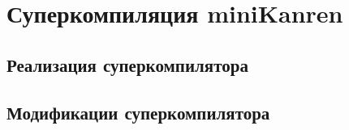 \section{Суперкомпиляция miniKanren}
% 
% 
% 
% 
% 
% 
% 

\subsection{Реализация суперкомпилятора}



\subsection{Модификации суперкомпилятора}



